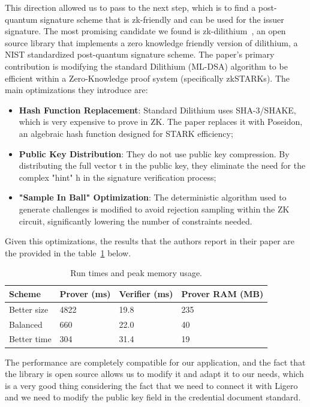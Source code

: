 \documentclass{article}
\begin{document}
This direction allowed us to pass to the next step, which is to find a post-quantum signature scheme that is zk-friendly and can be used for the issuer signature.
The most promising candidate we found is zk-dilithium~\cite{policharla2023postquantum}, an open source library that implements
a zero knowledge friendly version of dilithium, a NIST standardized post-quantum signature scheme.
The paper's primary contribution is modifying the standard Dilithium (ML-DSA) algorithm to be efficient within a Zero-Knowledge 
proof system (specifically zkSTARKs). The main optimizations they introduce are:
\begin{itemize}
      \item \textbf{Hash Function Replacement}: Standard Dilithium uses SHA-3/SHAKE, which is very expensive to prove in ZK. 
      The paper replaces it with Poseidon, an algebraic hash function designed for STARK efficiency;
      \item \textbf{Public Key Distribution}: They do not use public key compression. By distributing the full vector t in 
      the public key, they eliminate the need for the complex "hint" h in the signature verification process;
      \item \textbf{"Sample In Ball" Optimization}: The deterministic algorithm used to generate challenges is modified to 
      avoid rejection sampling within the ZK circuit, significantly lowering the number of constraints needed.
\end{itemize}
Given this optimizations, the results that the authors report in their paper are the provided in the table~\ref{tab:runtimes_memory} below.


\begin{table}[ht]
  \centering
  \caption{Run times and peak memory usage.}
  \label{tab:runtimes_memory}
  \small
  \begin{tabularx}{\textwidth}{@{}l X X X@{}}
    \toprule
    \textbf{Scheme} & \textbf{Prover (ms)} & \textbf{Verifier (ms)} & \textbf{Prover RAM (MB)} \\
    \midrule
    Better size & 4822 & 19.8 & 235 \\
    Balanced    & 660  & 22.0 & 40 \\
    Better time & 304  & 31.4 & 19 \\
    \bottomrule
  \end{tabularx}
\end{table}

The performance are completely compatible for our application, and the fact that the library is open source allows us to modify it 
and adapt it to our needs, which is a very good thing considering the fact that we need to connect it with Ligero and we need to
modify the public key field in the credential document standard.
\end{document}
